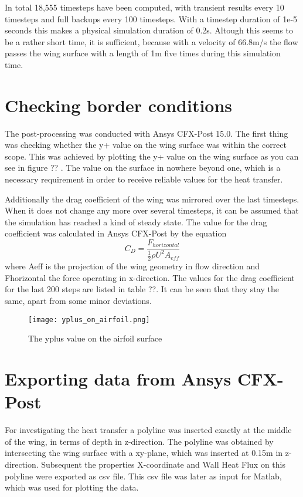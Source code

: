 In total 18,555 timesteps have been computed, with transient results every 10 timesteps and full backups every 100 timesteps. With a timestep duration of 1e-5 seconds this makes a physical simulation duration of 0.2s. Altough this seems to be a rather short time, it is sufficient, because with a velocity of 66.8m/s the flow passes the wing surface with a length of 1m five times during this simulation time.
\section{Checking border conditions}
The post-processing was conducted with Ansys CFX-Post 15.0. The first thing was checking whether the y+ value on the wing surface was within the correct scope. This was achieved by plotting the y+ value on the wing surface as you can see in figure ?? . The value on the surface in nowhere beyond one, which is a necessary requirement in order to receive reliable values for the heat transfer.

Additionally the drag coefficient of the wing was mirrored over the last timesteps. When it does not change any more over several timesteps, it can be assumed that the simulation has reached a kind of steady state. The value for the drag coefficient was calculated in Ansys CFX-Post by the equation
\begin{equation}
C_D = \frac{F_{horizontal}}{\frac{1}{2} \rho U^2 A_{eff}}
\end{equation}
where Aeff is the projection of the wing geometry in flow direction and Fhorizontal the force operating in x-direction.
The values for the drag coefficient for the last 200 steps are listed in table ??. It can be seen that they stay the same, apart from some minor deviations.
\begin{figure}[h]
\centering
\texttt{[image: yplus\_on\_airfoil.png]}
\caption{The yplus value on the airfoil surface}
\label{yplus}
\end{figure}
\section{Exporting data from Ansys CFX-Post}
For investigating the heat transfer a polyline was inserted exactly at the middle of the wing, in terms of depth in z-direction. The polyline was obtained by intersecting the wing surface with a xy-plane, which was inserted at 0.15m in z-direction. 
Subsequent the properties X-coordinate and Wall Heat Flux on this polyline were exported as csv file. This csv file was later as input for Matlab, which was used for plotting the data.

